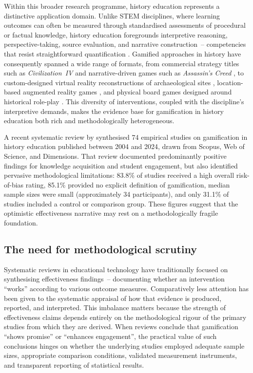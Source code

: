 \documentclass[etq]{acnsart}
\begin{document}
	Within this broader research programme, history education represents a distinctive application domain. Unlike STEM disciplines, where learning outcomes can often be measured through standardised assessments of procedural or factual knowledge, history education foregrounds interpretive reasoning, perspective-taking, source evaluation, and narrative construction~-- competencies that resist straightforward quantification \cite{12Gilbert2019108, 46Stirling2022}. Gamified approaches in history have consequently spanned a wide range of formats, from commercial strategy titles such as \textit{Civilization~IV} \cite{55Squire2004} and narrative-driven games such as \textit{Assassin's Creed} \cite{12Gilbert2019108}, to custom-designed virtual reality reconstructions of archaeological sites \cite{1Barbatsis201159}, location-based augmented reality games \cite{51Ardito2007}, and physical board games designed around historical role-play \cite{38Mercik2024}. This diversity of interventions, coupled with the discipline's interpretive demands, makes the evidence base for gamification in history education both rich and methodologically heterogeneous.
	
	A recent systematic review by \citet{KorniienkoSemerikov2024} synthesised 74 empirical studies on gamification in history education published between 2004 and 2024, drawn from Scopus, Web of Science, and Dimensions. That review documented predominantly positive findings for knowledge acquisition and student engagement, but also identified pervasive methodological limitations: 83.8\% of studies received a high overall risk-of-bias rating, 85.1\% provided no explicit definition of gamification, median sample sizes were small (approximately 34 participants), and only 31.1\% of studies included a control or comparison group. These figures suggest that the optimistic effectiveness narrative may rest on a methodologically fragile foundation.
	
	\subsection{The need for methodological scrutiny}
	\label{sec:intro_need}
	
	Systematic reviews in educational technology have traditionally focused on synthesising effectiveness findings~-- documenting whether an intervention ``works'' according to various outcome measures. Comparatively less attention has been given to the systematic appraisal of how that evidence is produced, reported, and interpreted. This imbalance matters because the strength of effectiveness claims depends entirely on the methodological rigour of the primary studies from which they are derived. When reviews conclude that gamification ``shows promise'' or ``enhances engagement'', the practical value of such conclusions hinges on whether the underlying studies employed adequate sample sizes, appropriate comparison conditions, validated measurement instruments, and transparent reporting of statistical results.
	
\end{document}
